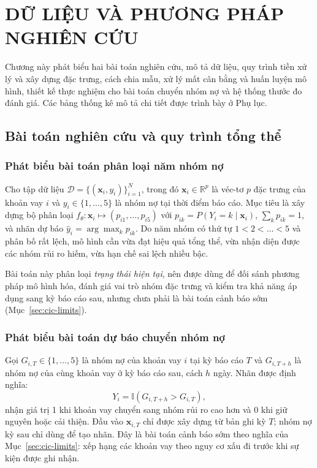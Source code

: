 \chapter{DỮ LIỆU VÀ PHƯƠNG PHÁP NGHIÊN CỨU}

Chương này phát biểu hai bài toán nghiên cứu, mô tả dữ liệu, quy trình tiền xử lý và xây dựng đặc trưng, cách chia mẫu, xử lý mất cân bằng và huấn luyện mô hình, thiết kế thực nghiệm cho bài toán chuyển nhóm nợ và hệ thống thước đo đánh giá. Các bảng thống kê mô tả chi tiết được trình bày ở Phụ lục.

\section{Bài toán nghiên cứu và quy trình tổng thể}

\subsection{Phát biểu bài toán phân loại năm nhóm nợ}

Cho tập dữ liệu $\mathcal{D}=\{(\mathbf{x}_i,y_i)\}_{i=1}^{N}$, trong đó $\mathbf{x}_i\in\mathbb{R}^{p}$ là véc-tơ $p$ đặc trưng của khoản vay $i$ và $y_i\in\{1,\dots,5\}$ là nhóm nợ tại thời điểm báo cáo. Mục tiêu là xây dựng bộ phân loại $f_{\theta}:\mathbf{x}_i\mapsto(p_{i1},\dots,p_{i5})$ với $p_{ik}=P(Y_i=k\mid\mathbf{x}_i)$, $\sum_{k}p_{ik}=1$, và nhãn dự báo $\hat{y}_i=\arg\max_{k}p_{ik}$. Do năm nhóm có thứ tự $1<2<\dots<5$ và phân bố rất lệch, mô hình cần vừa đạt hiệu quả tổng thể, vừa nhận diện được các nhóm rủi ro hiếm, vừa hạn chế sai lệch nhiều bậc.

Bài toán này phân loại \emph{trạng thái hiện tại}, nên được dùng để đối sánh phương pháp mô hình hóa, đánh giá vai trò nhóm đặc trưng và kiểm tra khả năng áp dụng sang kỳ báo cáo sau, nhưng chưa phải là bài toán cảnh báo sớm (Mục~\ref{sec:cic-limits}).

\subsection{Phát biểu bài toán dự báo chuyển nhóm nợ}
\label{sec:scope-transition}

Gọi $G_{i,T}\in\{1,\dots,5\}$ là nhóm nợ của khoản vay $i$ tại kỳ báo cáo $T$ và $G_{i,T+h}$ là nhóm nợ của cùng khoản vay ở kỳ báo cáo sau, cách $h$ ngày. Nhãn được định nghĩa:
\[
Y_i=\mathbb{I}(G_{i,T+h}>G_{i,T}),
\]
nhận giá trị 1 khi khoản vay chuyển sang nhóm rủi ro cao hơn và 0 khi giữ nguyên hoặc cải thiện. Đầu vào $\mathbf{x}_{i,T}$ chỉ được xây dựng từ bản ghi kỳ $T$; nhóm nợ kỳ sau chỉ dùng để tạo nhãn. Đây là bài toán cảnh báo sớm theo nghĩa của Mục~\ref{sec:cic-limits}: xếp hạng các khoản vay theo nguy cơ xấu đi trước khi sự kiện được ghi nhận.

